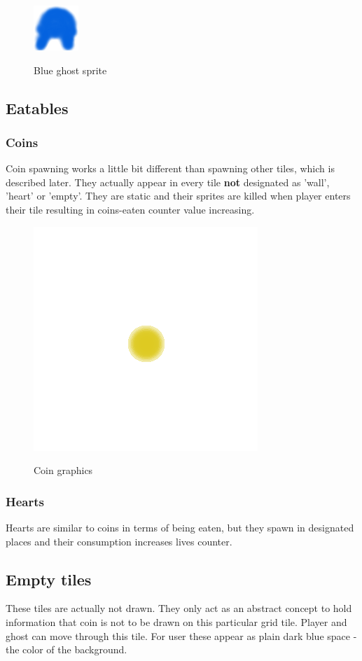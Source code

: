 \documentclass[11pt,a4paper]{report}
\newcommand{\dsubsection}[1]{\FloatBarrier \subsection{#1}}
\newenvironment{img}{
	\begin{center}
		\begin{figure}[H]
			\begin{center}
			
}{
	\end{center}
		\end{figure}
			\end{center}
}
\begin{document}
				 \begin{img}
				 	\includegraphics{images/blueghost}\\
				 	\caption{Blue ghost sprite}
				 \end{img}
			\dsubsection{Eatables}
				\subsubsection{Coins}
					Coin spawning works a little bit different than spawning other tiles, which is described later. They actually appear in every tile \textbf{not} designated as 'wall', 'heart' or 'empty'. They are static and their sprites are killed when player enters their tile resulting in coins-eaten counter value increasing.
					\begin{img}
						\includegraphics{images/coin}\\
						\caption{Coin graphics}
					\end{img}
				\subsubsection{Hearts}
					Hearts are similar to coins in terms of being eaten, but they spawn in designated places and their consumption increases lives counter.
			\dsubsection{Empty tiles}
				These tiles are actually not drawn. They only act as an abstract concept to hold information that coin is not to be drawn on this particular grid tile. Player and ghost can move through this tile. For user these appear as plain dark blue space - the color of the background.
\end{document}
